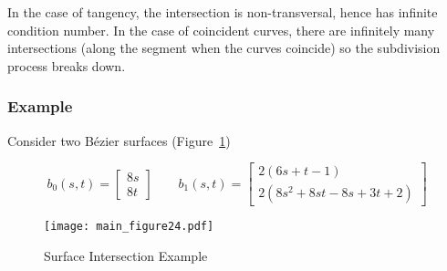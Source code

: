 \documentclass[oneside, reqno]{amsart}
\theoremstyle{definition}
\begin{document}
In the case of tangency, the intersection is non-transversal, hence has
infinite condition number. In the case of coincident curves, there are
infinitely many intersections (along the segment when the curves
coincide) so the subdivision process breaks down.

\subsubsection{Example}

Consider two B\'{e}zier surfaces
(Figure~\ref{fig:surface-surface-example})

\begin{equation}
b_0(s, t) =
\left[ \begin{array}{c}
    8 s \\ 8 t \end{array}\right] \qquad
b_1(s, t) =
\left[ \begin{array}{c}
    2 (6 s + t - 1) \\
    2 (8 s^2 + 8 s t - 8 s + 3 t + 2) \end{array}\right]
\end{equation}
\begin{figure}
  \texttt{[image: main\_figure24.pdf]}
  \centering
  \captionsetup{width=.75\linewidth}
  \caption{Surface Intersection Example}
  \label{fig:surface-surface-example}
\end{figure}
\end{document}
